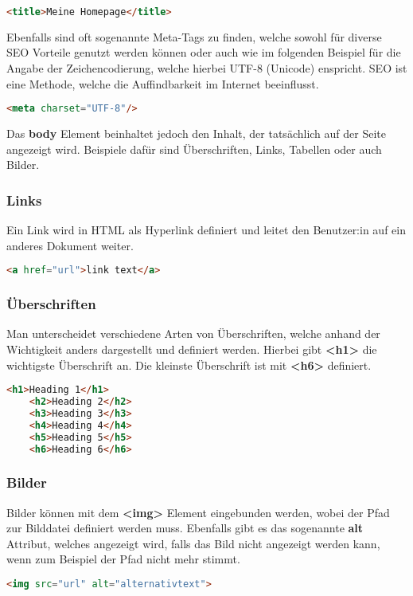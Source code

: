 \begin{lstlisting}[language=html]
    <title>Meine Homepage</title>
\end{lstlisting}

Ebenfalls sind oft sogenannte Meta-Tags zu finden, welche sowohl für diverse SEO Vorteile genutzt werden können oder auch wie im folgenden Beispiel für die Angabe der Zeichencodierung, welche hierbei UTF-8 (Unicode) enspricht.
SEO ist eine Methode, welche die Auffindbarkeit im Internet beeinflusst.

\begin{lstlisting}[language=html]
    <meta charset="UTF-8"/>
\end{lstlisting}

Das \textbf{body} Element beinhaltet jedoch den Inhalt, der tatsächlich auf der Seite angezeigt wird. Beispiele dafür sind Überschriften, Links, Tabellen oder auch Bilder.

\cite{frontend_web_html}

\subsubsection{Links}
Ein Link wird in HTML als Hyperlink definiert und leitet den Benutzer:in auf ein anderes Dokument weiter.

\begin{lstlisting}[language=html]
    <a href="url">link text</a>
\end{lstlisting}

\cite{frontend_web_html_links}

\subsubsection{Überschriften}
Man unterscheidet verschiedene Arten von Überschriften, welche anhand der Wichtigkeit anders dargestellt und definiert werden. Hierbei gibt \textbf{<h1>} die wichtigste Überschrift an. Die kleinste Überschrift ist mit \textbf{<h6>} definiert.

\begin{lstlisting}[language=html, caption=HTML Headings]
    <h1>Heading 1</h1>
    <h2>Heading 2</h2>
    <h3>Heading 3</h3>
    <h4>Heading 4</h4>
    <h5>Heading 5</h5>
    <h6>Heading 6</h6>
\end{lstlisting}

\cite{frontend_web_html_überschriften}

\newpage
\subsubsection{Bilder}
\newline
Bilder können mit dem \textbf{<img>} Element eingebunden werden, wobei der Pfad zur Bilddatei definiert werden muss. Ebenfalls gibt es das sogenannte \textbf{alt} Attribut, welches angezeigt wird, falls das Bild nicht angezeigt werden kann, wenn zum Beispiel der Pfad nicht mehr stimmt.

\begin{lstlisting}[language=html]
    <img src="url" alt="alternativtext">
\end{lstlisting}




